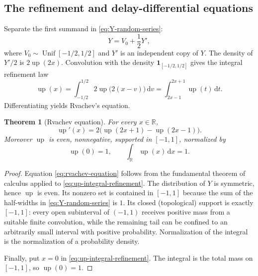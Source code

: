 \documentclass[11pt,oneside]{article}
\newtheorem{theorem}{Theorem}[section]
\theoremstyle{definition}
\theoremstyle{remark}
\newcommand{\upf}{\operatorname{up}}
\newcommand{\dd}{\,\mathrm d}
\newcommand{\R}{\mathbb R}
\begin{document}
\subsection{The refinement and delay-differential equations}

Separate the first summand in \eqref{eq:Y-random-series}:
\begin{equation}\label{eq:Y-decompose}
  Y=V_0+\frac12Y',
\end{equation}
where $V_0\sim\operatorname{Unif}[-1/2,1/2]$ and $Y'$ is an independent copy of
$Y$.  The density of $Y'/2$ is $2\upf(2x)$.  Convolution with the density
$\mathbf1_{[-1/2,1/2]}$ gives the integral refinement law
\begin{equation}\label{eq:up-integral-refinement}
  \upf(x)=\int_{-1/2}^{1/2}2\upf\bigl(2(x-v)\bigr)\dd v
         =\int_{2x-1}^{2x+1}\upf(t)\dd t.
\end{equation}
Differentiating yields Rvachev's equation.

\begin{theorem}[Rvachev equation]\label{thm:rvachev-equation}
For every $x\in\R$,
\begin{equation}\label{eq:rvachev-equation}
  \upf'(x)=2\bigl(\upf(2x+1)-\upf(2x-1)\bigr).
\end{equation}
Moreover $\upf$ is even, nonnegative, supported in $[-1,1]$, normalized by
\begin{equation}\label{eq:up-normalization}
  \upf(0)=1,
  \qquad
  \int_{\R}\upf(x)\dd x=1.
\end{equation}
\end{theorem}

\begin{proof}
Equation \eqref{eq:rvachev-equation} follows from the fundamental theorem of
calculus applied to \eqref{eq:up-integral-refinement}.  The distribution of $Y$ is
symmetric, hence $\upf$ is even.  Its nonzero set is contained in $[-1,1]$
because the sum of the half-widths in \eqref{eq:Y-random-series} is $1$.  Its
closed (topological) support is exactly $[-1,1]$: every open subinterval of
$(-1,1)$ receives positive mass from a suitable finite convolution, while the
remaining tail can be confined to an arbitrarily small interval with positive
probability.  Normalization of the integral is the
normalization of a probability density.

Finally, put $x=0$ in \eqref{eq:up-integral-refinement}.  The integral is the total
mass on $[-1,1]$, so $\upf(0)=1$.
\end{proof}
\end{document}
